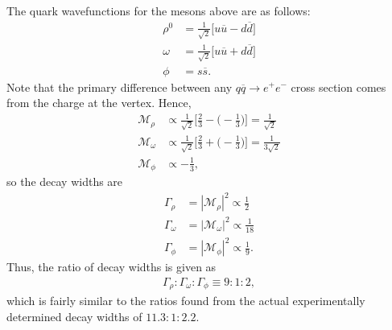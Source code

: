 The quark wavefunctions for the mesons above are as follows:
\begin{align}
    \label{eq:q-wavefuncs}
    \rho^{0} &= \frac{1}{\sqrt{2}}\Big[ u\overline{u} - d\overline{d} \Big] \\
    \omega &= \frac{1}{\sqrt{2}}\Big[ u\overline{u} + d\overline{d} \Big] \\
    \phi &= s\overline{s}
.\end{align}
Note that the primary difference between any $q\overline{q} \rightarrow e^{+}e^{-}$ cross section comes from the charge at the vertex.
Hence,
\begin{align}
    \label{eq:vertex-factors}
    \mathcal{M}_{\rho} &\propto \frac{1}{\sqrt{2}} \Big[ \frac{2}{3} -  \Big( -\frac{1}{3} \Big) \Big] = \frac{1}{\sqrt{2}} \\
    \mathcal{M}_{\omega} &\propto \frac{1}{\sqrt{2}} \Big[ \frac{2}{3} +  \Big( -\frac{1}{3} \Big) \Big] = \frac{1}{3\sqrt{2}} \\
    \mathcal{M}_{\phi} &\propto -\frac{1}{3}
,\end{align}
so the decay widths are
\begin{align}
    \label{eq:cs-props}
    \Gamma_{\rho} &= |\mathcal{M}_{\rho}|^2 \propto \frac{1}{2} \\
    \Gamma_{\omega} &= |\mathcal{M}_{\omega}|^2 \propto \frac{1}{18} \\
    \Gamma_{\phi} &= |\mathcal{M}_{\phi}|^2 \propto \frac{1}{9}
.\end{align}
Thus, the ratio of decay widths is given as
\begin{eqnarray}
    \label{eq:decay-widths}
    \Gamma_{\rho} : \Gamma_{\omega} : \Gamma_{\phi} \equiv 9 : 1 : 2
,\end{eqnarray}
which is fairly similar to the ratios found from the actual experimentally determined decay widths of $11.3: 1 : 2.2$.






